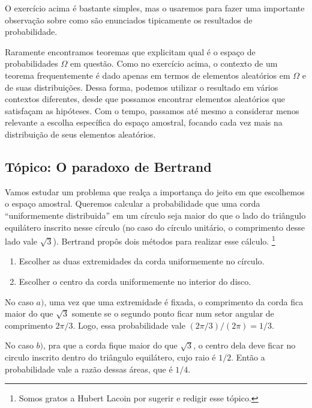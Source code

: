 \documentclass[../main/Notas_de_aula.tex]{subfiles}
\begin{document}
O exercício acima é bastante simples, mas o usaremos para fazer uma importante observação sobre como são enunciados tipicamente os resultados de probabilidade.

Raramente encontramos teoremas que explicitam qual é o espaço de probabilidades $\Omega$ em questão.
Como no exercício acima, o contexto de um teorema frequentemente é dado apenas em termos de elementos aleatórios em $\Omega$ e de suas distribuições.
Dessa forma, podemos utilizar o resultado em vários contextos diferentes, desde que possamos encontrar elementos aleatórios que satisfaçam as hipóteses.
Com o tempo, passamos até mesmo a considerar menos relevante a escolha específica do espaço amostral, focando cada vez mais na distribuição de seus elementos aleatórios.

\begin{topics}

\section{Tópico: O paradoxo de Bertrand}

Vamos estudar um problema que realça a importança do jeito em que escolhemos o espaço amostral.
Queremos calcular a probabilidade que uma corda ``uniformemente distribuida'' em um círculo seja maior do que o lado do triângulo equilátero inscrito nesse  círculo (no caso do círculo unitário, o comprimento desse lado vale $\sqrt{3}$).
Bertrand propôs dois métodos para realizar esse cálculo.  \footnote{Somos gratos a Hubert Lacoin por sugerir e redigir esse tópico.}

\begin{enumerate}[\quad a)]
 \item Escolher as duas extremidades da corda uniformemente no círculo.
 \item Escolher o centro da corda uniformemente no interior do disco.
\end{enumerate}

No caso $a)$, uma vez que uma extremidade é fixada, o comprimento da corda fica maior do que $\sqrt{3}$ somente se o segundo ponto ficar num setor angular de comprimento $2 \pi / 3$.
Logo, essa probabilidade vale $(2\pi/3) / (2\pi) = 1/3$.

\medskip

No caso $b)$, pra que a corda fique maior do que $\sqrt{3}$, o centro dela deve ficar no circulo inscrito dentro do triângulo equilátero, cujo raio é $1/2$.
Então a probabilidade vale a razão dessas áreas, que é $1/4$.


\end{topics}
\end{document}
